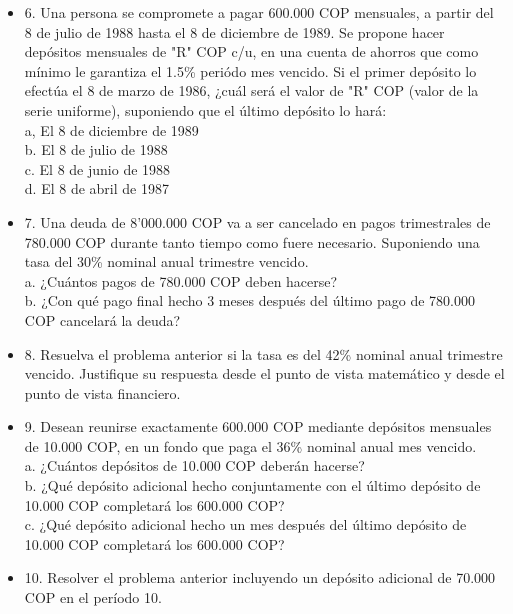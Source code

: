\begin{itemize}
 \item 6. Una persona se compromete a pagar 600.000 COP mensuales, a partir del 8 de julio de 1988 hasta el 8 de diciembre de 1989. Se propone hacer depósitos mensuales de "R" COP c/u, en una cuenta de ahorros que como mínimo le garantiza el 1.5\% periódo mes vencido. Si el primer depósito lo efectúa el 8 de marzo de 1986, ¿cuál será el valor de "R" COP (valor de la serie uniforme), suponiendo que el último depósito lo hará:\\
       a, El 8 de diciembre de 1989\\
       b. El 8 de julio de 1988\\
       c. El 8 de junio de 1988\\
       d. El 8 de abril de 1987\\
       \medskip

 \item 7. Una deuda de 8'000.000 COP va a ser cancelado en pagos trimestrales de 780.000 COP durante tanto tiempo como fuere necesario. Suponiendo una tasa del 30\% nominal anual trimestre vencido.\\
       a. ¿Cuántos pagos de 780.000 COP deben hacerse?\\
       b. ¿Con qué pago final hecho 3 meses después del último pago de 780.000 COP cancelará la deuda?\\
       \medskip

 \item 8. Resuelva el problema anterior si la tasa es del 42\% nominal anual trimestre vencido. Justifique su respuesta desde el punto de vista matemático y desde el punto de vista financiero.\\
       \medskip

 \item 9. Desean reunirse exactamente 600.000 COP mediante depósitos mensuales de 10.000 COP, en un fondo que paga el 36\% nominal anual mes vencido.\\
       a. ¿Cuántos depósitos de 10.000 COP deberán hacerse?\\
       b. ¿Qué depósito adicional hecho conjuntamente con el último depósito de 10.000 COP completará los 600.000 COP?\\
       c. ¿Qué depósito adicional hecho un mes después del último depósito de 10.000 COP completará los 600.000 COP?\\
       \medskip
 \item 10. Resolver el problema anterior incluyendo un depósito adicional de 70.000 COP en el período 10.\\
       \medskip


\end{itemize}
